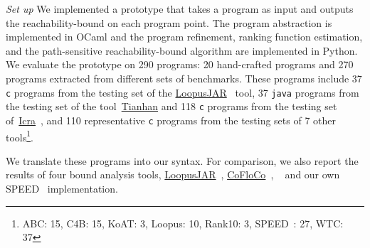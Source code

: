 \emph{Set up} We implemented a prototype {\THESYSTEM} that takes a program as input 
and outputs the reachability-bound on each program point.
The 
program abstraction is implemented in OCaml and the program refinement, ranking function estimation, and the path-sensitive reachability-bound algorithm are implemented in Python.
We evaluate the prototype on 290 programs: 20 hand-crafted programs and 270 programs extracted from different sets of benchmarks. 
These programs include  37 {\tt c} programs 
from the testing set of the \hyperlink{https://forsyte.at/static/people/sinn/loopusJAR/index.html}{LoopusJAR}~\cite{BenchmarkLoopus} tool,
37 {\tt java} programs from the testing set of the tool~\hyperlink{https://zenodo.org/record/5140586\#.Y5pBoC-B1QI}{Tianhan}\cite{BenchmarkTianhan,LuCT21} 
and 118 {\tt c} programs from the testing set of~\hyperlink{https://github.com/icra-team/icra}{Icra}~\cite{KincaidBCR19,CyphertBKR19}, and 110 representative {\tt c} programs from the testing sets of 7 other tools\footnote{ABC: 15, C4B: 15, KoAT: 3, Loopus: 10, Rank10: 3, SPEED~\cite{GulwaniJK09,GulwaniZ10,GulwaniMC09}: 27, WTC: 37}.

%
We translate these programs into our syntax.
For comparison, we also report the results of four bound analysis tools, 
\hyperlink{https://forsyte.at/software/loopus/}{LoopusJAR}~\cite{SinnZV17},
\hyperlink{https://github.com/aeflores/CoFloCo/tree/master/src}{CoFloCo}~\cite{ToolCofloco},
~\cite{BenchmarkTianhan}
and our own SPEED~\cite{GulwaniJK09} implementation.

